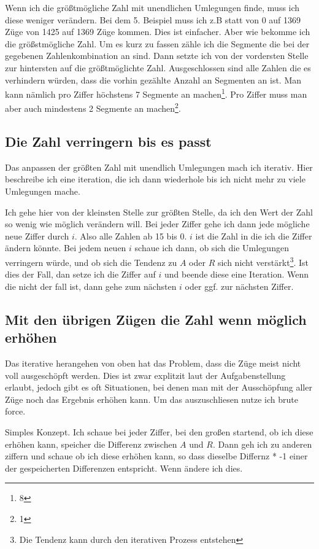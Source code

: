 \documentclass[a4paper,10pt,ngerman]{scrartcl}
\begin{document}
Wenn ich die größtmögliche Zahl mit unendlichen Umlegungen finde, muss ich diese weniger verändern. Bei dem 5. Beispiel muss ich z.B statt von 0 auf 1369 Züge von 1425 auf 1369 Züge kommen. Dies ist einfacher. Aber wie bekomme ich die größstmögliche Zahl. Um es kurz zu fassen zähle ich die Segmente die bei der gegebenen Zahlenkombination an sind. Dann setzte ich von der vordersten Stelle zur hintersten auf die größtmöglichte Zahl. Ausgeschlossen sind alle Zahlen die es verhindern würden, dass die vorhin gezählte Anzahl an Segmenten an ist. Man kann nämlich pro Ziffer höchstens 7 Segmente an machen\footnote{8}. Pro Ziffer muss man aber auch mindestens 2 Segmente an machen\footnote{1}.

\subsection{Die Zahl verringern bis es passt}

Das anpassen der größten Zahl mit unendlich Umlegungen mach ich iterativ. Hier beschreibe ich eine iteration, die ich dann wiederhole bis ich nicht mehr zu viele Umlegungen mache.

Ich gehe hier von der kleinsten Stelle zur größten Stelle, da ich den Wert der Zahl so wenig wie möglich verändern will. Bei jeder Ziffer gehe ich dann jede mögliche neue Ziffer durch $i$. Also alle Zahlen ab 15 bis 0. $i$ ist die Zahl in die ich die Ziffer ändern könnte. Bei jedem neuen $i$ schaue ich dann, ob sich die Umlegungen verringern würde, und ob sich die Tendenz zu $A$ oder $R$ sich nicht verstärkt\footnote{Die Tendenz kann durch den iterativen Prozess entstehen}. Ist dies der Fall, dan setze ich die Ziffer auf $i$ und beende diese eine Iteration. Wenn die nicht der fall ist, dann gehe zum nächsten $i$ oder ggf. zur nächsten Ziffer.

\subsection{Mit den übrigen Zügen die Zahl wenn möglich erhöhen}

Das iterative herangehen von oben hat das Problem, dass die Züge meist nicht voll ausgeschöpft werden. Dies ist zwar explitzit laut der Aufgabenstellung erlaubt, jedoch gibt es oft Situationen, bei denen man mit der Ausschöpfung aller Züge noch das Ergebnis erhöhen kann. Um das auszuschliesen nutze ich brute force.

Simples Konzept. Ich schaue bei jeder Ziffer, bei den großen startend, ob ich diese erhöhen kann, speicher die Differenz zwischen $A$ und $R$.
Dann geh ich zu anderen ziffern und schaue ob ich diese erhöhen kann, so dass dieselbe Differnz * -1 einer der gespeicherten Differenzen entspricht. Wenn ändere ich dies.
 
\end{document}
